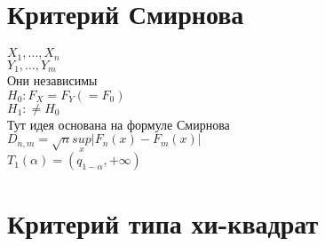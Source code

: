 \documentclass{article}
\newcommand\0{\mathbb{0}}
\newcommand\1{\mathbb{1}}
\begin{document}
\section{Критерий Смирнова}
$X_1, \dots, X_n$\\
$Y_1, \dots, Y_m$\\
Они независимы\\
$H_0: F_X = F_Y (= F_0)$\\
$H_1: \neq H_0$\\
Тут идея основана на формуле Смирнова\\
$D_{n, m} = \sqrt{n}\underset{x}{sup}|F_n(x) - F_m(x)|$\\
$T_1(\alpha) = (q_{1 - \alpha}, +\infty)$

\section{Критерий типа хи-квадрат}
\end{document}
